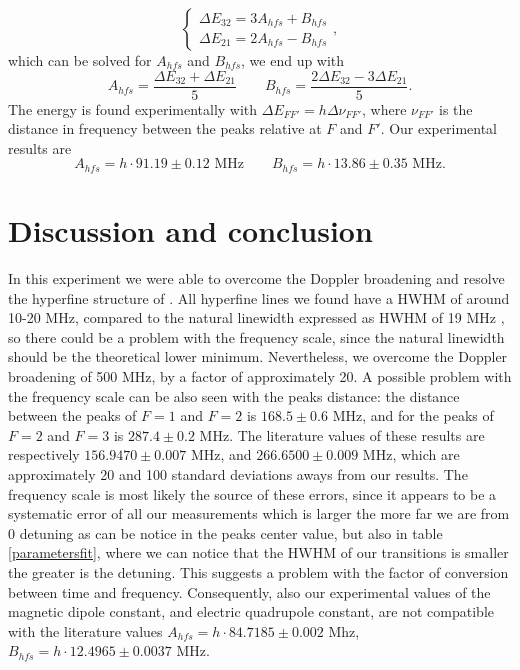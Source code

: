 \documentclass[a4paper,10pt]{article}
\begin{document}
\begin{equation}\begin{cases}
\Delta E_{32} = 3A_{hfs} + B_{hfs}\\
\Delta E_{21} = 2A_{hfs}-B_{hfs}
\end{cases},\end{equation}
which can be solved for $A_{hfs}$ and $B_{hfs}$, we end up with
\begin{equation}A_{hfs} = \frac{\Delta E_{32} + \Delta E_{21}}{5} \qquad B_{hfs} = \frac{2\Delta E_{32} - 3\Delta E_{21}}{5}.\end{equation}
The energy is found experimentally with $\Delta E_{FF'} = h\Delta\nu_{FF'}$, where $\nu_{FF'}$ is the distance in frequency between the peaks relative at $F$ and $F'$. Our experimental results are
\begin{equation}A_{hfs} = h \cdot 91.19\pm 0.12\,\, \text{MHz}\qquad B_{hfs} = h\cdot 13.86\pm0.35\,\, \text{MHz}.\end{equation}

\section{Discussion and conclusion}
In this experiment we were able to overcome the Doppler broadening and resolve the hyperfine structure of . All hyperfine lines we found have a HWHM of around 10-20 MHz, compared to the natural linewidth expressed as HWHM of 19 MHz \cite{rubidium87data}, so there could be a problem with the frequency scale, since the natural linewidth should be the theoretical lower minimum. Nevertheless, we overcome the Doppler broadening of 500 MHz, by a factor of approximately 20. A possible problem with the frequency scale can be also seen with the peaks distance: the distance between the peaks of $F=1$ and $F=2$ is $168.5\pm0.6$ MHz, and for the peaks of $F=2$ and $F=3$ is $287.4\pm 0.2$ MHz. The literature values of these results are respectively \cite{rubidium87data} $156.9470\pm 0.007$ MHz, and $266.6500\pm0.009$ MHz, which are approximately 20 and 100 standard deviations aways from our results. The frequency scale is most likely the source of these errors, since it appears to be a systematic error of all our measurements which is larger the more far we are from 0 detuning as can be notice in the peaks center value, but also in table \ref{parametersfit}, where we can notice that the HWHM of our transitions is smaller the greater is the detuning. This suggests a problem with the factor of conversion between time and frequency. Consequently, also our experimental values of the magnetic dipole constant, and electric quadrupole constant, are not compatible with the literature values \cite{rubidium87data} $A_{hfs} = h\cdot84.7185\pm0.002$ Mhz, $B_{hfs} = h\cdot 12.4965\pm 0.0037$ MHz.
\end{document}
